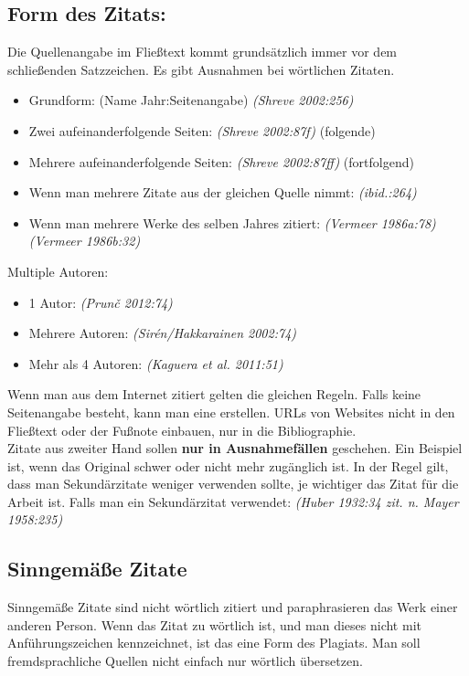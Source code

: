 \documentclass{article}
\begin{document}
	\subsection{Form des Zitats:}
	Die Quellenangabe im Fließtext kommt grundsätzlich immer vor dem schließenden Satzzeichen. Es gibt Ausnahmen bei wörtlichen Zitaten.
	\begin{itemize}
		\item{Grundform: (Name Jahr:Seitenangabe) \textit{(Shreve 2002:256)}}
		\item{Zwei aufeinanderfolgende Seiten: \textit{(Shreve 2002:87f)} (folgende)}
		\item{Mehrere aufeinanderfolgende Seiten: \textit{(Shreve 2002:87ff)} (fortfolgend)}
		\item{Wenn man mehrere Zitate aus der gleichen Quelle nimmt: \textit{(ibid.:264)}}
		\item{Wenn man mehrere Werke des selben Jahres zitiert: \textit{(Vermeer 1986a:78) (Vermeer 1986b:32)}}
	\end{itemize}
	Multiple Autoren:
	\begin{itemize}
		\item{1 Autor: \textit{(Prun\v c  2012:74)}}
		\item{Mehrere Autoren: \textit{(Sirén/Hakkarainen 2002:74)}}
		\item{Mehr als 4 Autoren: \textit{(Kaguera et al. 2011:51)}}
	\end{itemize}

	Wenn man aus dem Internet zitiert gelten die gleichen Regeln. Falls keine Seitenangabe besteht, kann man eine erstellen. URLs von Websites nicht in den Fließtext oder der Fußnote einbauen, nur in die Bibliographie. \\
	Zitate aus zweiter Hand sollen \textbf{nur in Ausnahmefällen} geschehen. Ein Beispiel ist, wenn das Original schwer oder nicht mehr zugänglich ist. In der Regel gilt, dass man Sekundärzitate weniger verwenden sollte, je wichtiger das Zitat für die Arbeit ist. Falls man ein Sekundärzitat verwendet: \textit{(Huber 1932:34 zit. n. Mayer 1958:235)}

	\subsection{Sinngemäße Zitate}
	Sinngemäße Zitate sind nicht wörtlich zitiert und paraphrasieren das Werk einer anderen Person. Wenn das Zitat zu wörtlich ist, und man dieses nicht mit Anführungszeichen kennzeichnet, ist das eine Form des Plagiats. Man soll fremdsprachliche Quellen nicht einfach nur wörtlich übersetzen. \\
\end{document}
